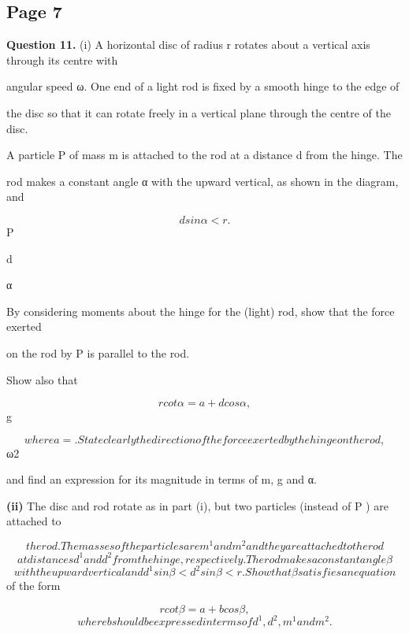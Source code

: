 \documentclass[12pt]{article}
\begin{document}
\subsection*{Page 7}
\begin{flushleft}
\bigskip\textbf{Question 11.} (i) A horizontal disc of radius r rotates about a vertical axis through its centre with\par
angular speed ω. One end of a light rod is fixed by a smooth hinge to the edge of\par
the disc so that it can rotate freely in a vertical plane through the centre of the disc.\par
A particle P of mass m is attached to the rod at a distance d from the hinge. The\par
rod makes a constant angle α with the upward vertical, as shown in the diagram, and\par
\[d sin α < r.\]
P\par
d\par
α\par
By considering moments about the hinge for the (light) rod, show that the force exerted\par
on the rod by P is parallel to the rod.\par
Show also that\par
\[r cot α = a + d cos α ,\]
g\par
\[where a = . State clearly the direction of the force exerted by the hinge on the rod,\]
ω2\par
and find an expression for its magnitude in terms of m, g and α.\par
\textbf{(ii)} The disc and rod rotate as in part (i), but two particles (instead of P ) are attached to\par
\[the rod. The masses of the particles are m^1 and m^2 and they are attached to the rod\]
\[at distances d^1 and d^2 from the hinge, respectively. The rod makes a constant angle β\]
\[with the upward vertical and d^1 sin β < d^2 sin β < r. Show that β satisfies an equation\]
of the form\par
\[r cot β = a + b cos β ,\]
\[where b should be expressed in terms of d^1, d^2, m^1 and m^2.\]
\end{flushleft}
\end{document}
